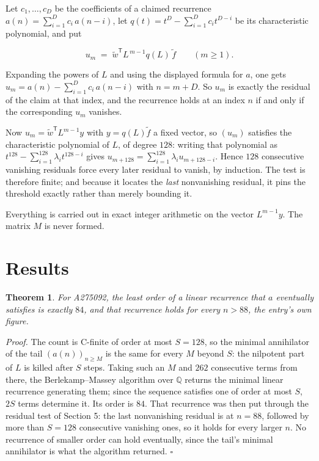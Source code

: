 \documentclass[11pt]{article}
\newtheorem{theorem}{Theorem}
\theoremstyle{definition}
\begin{document}
Let $c_1,\dots,c_D$ be the coefficients of a claimed recurrence $a(n) = \sum_{i=1}^{D} c_i\,a(n-i)$, let $q(t) = t^{D} - \sum_{i=1}^{D} c_i t^{D-i}$ be its characteristic polynomial, and put

\[u_m \;=\; \tilde w^{\mathsf T} L^{\,m-1} q(L)\,\tilde f \qquad (m \ge 1).\]

Expanding the powers of $L$ and using the displayed formula for $a$, one gets $u_m = a(n) - \sum_{i=1}^{D} c_i\,a(n-i)$ with $n = m + D$. So $u_m$ is exactly the residual of the claim at that index, and the recurrence holds at an index $n$ if and only if the corresponding $u_m$ vanishes.

Now $u_m = \tilde w^{\mathsf T} L^{m-1} y$ with $y = q(L)\tilde f$ a fixed vector, so $(u_m)$ satisfies the characteristic polynomial of $L$, of degree $128$: writing that polynomial as $t^{128} - \sum_{i=1}^{128} \lambda_i t^{128-i}$ gives $u_{m+128} = \sum_{i=1}^{128} \lambda_i u_{m+128-i}$. Hence $128$ consecutive vanishing residuals force every later residual to vanish, by induction. The test is therefore finite; and because it locates the {\itshape last} nonvanishing residual, it pins the threshold exactly rather than merely bounding it.

Everything is carried out in exact integer arithmetic on the vector $L^{m-1}y$. The matrix $M$ is never formed.

\section{Results}

\begin{theorem} For A275092, the least order of a linear recurrence that $a$ eventually satisfies is exactly $84$, and that recurrence holds for every $n > 88$, the entry's own figure.\end{theorem}

{\itshape Proof.} The count is C-finite of order at most $S = 128$, so the minimal annihilator of the tail $(a(n))_{n \ge M}$ is the same for every $M$ beyond $S$: the nilpotent part of $L$ is killed after $S$ steps. Taking such an $M$ and $262$ consecutive terms from there, the Berlekamp--Massey algorithm over $\mathbb{Q}$ returns the minimal linear recurrence generating them; since the sequence satisfies one of order at most $S$, $2S$ terms determine it. Its order is $84$. That recurrence was then put through the residual test of Section 5: the last nonvanishing residual is at $n = 88$, followed by more than $S = 128$ consecutive vanishing ones, so it holds for every larger $n$. No recurrence of smaller order can hold eventually, since the tail's minimal annihilator is what the algorithm returned. $\square$
\end{document}
